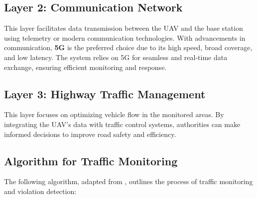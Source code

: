 \vspace{\baselineskip} %

\subsection{Layer 2: Communication Network}
This layer facilitates data transmission between the UAV and the base station using telemetry or modern communication technologies. With advancements in communication, \textbf{5G} is the preferred choice due to its high speed, broad coverage, and low latency. The system relies on 5G for seamless and real-time data exchange, ensuring efficient monitoring and response.

\vspace{\baselineskip} %

\subsection{Layer 3: Highway Traffic Management}
This layer focuses on optimizing vehicle flow in the monitored areas. By integrating the UAV’s data with traffic control systems, authorities can make informed decisions to improve road safety and efficiency.

\vspace{\baselineskip} %

\subsection{Algorithm for Traffic Monitoring}
The following algorithm, adapted from \cite{khan2024smarttraffic}, outlines the process of traffic monitoring and violation detection:




